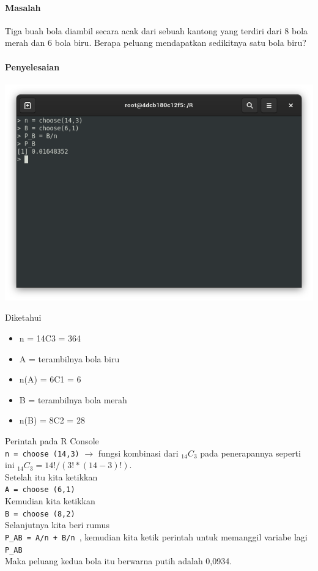 \documentclass[a4paper,12pt]{article}
\begin{document}
\paragraph{Masalah\\}
Tiga buah bola diambil secara acak dari sebuah kantong yang terdiri dari 8 bola merah dan 6 bola biru. Berapa peluang mendapatkan sedikitnya satu bola biru?
\paragraph{Penyelesaian\\}
\begin{center}
	\includegraphics[scale=.5]{lat1}
\end{center}

Diketahui 
\begin{itemize}
	\item n = 14C3 = 364
	\item A = terambilnya bola biru
	\item n(A) = 6C1 = 6
	\item B = terambilnya bola merah
	\item n(B) = 8C2 = 28
\end{itemize} 
Perintah pada R Console\\ 
\texttt{n = choose (14,3)} $\rightarrow$ fungsi kombinasi dari  $_{14}C_{3}$ pada penerapannya seperti ini $_{14}C_{3} = 14!/(3!*(14-3)!)$. \\
Setelah itu kita ketikkan\\ 
\texttt{A = choose (6,1)}\\
Kemudian kita ketikkan\\ 
\texttt{B = choose (8,2)}\\ 
Selanjutnya kita beri rumus\\  
\texttt{P\_AB = A/n + B/n }, kemudian kita ketik perintah untuk memanggil variabe lagi\\ 
\texttt{P\_AB}\\ 
Maka peluang kedua bola itu berwarna putih adalah 0,0934.
\end{document}
